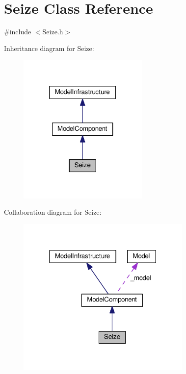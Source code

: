 \hypertarget{class_seize}{}\section{Seize Class Reference}
\label{class_seize}


{\ttfamily \#include $<$Seize.\+h$>$}



Inheritance diagram for Seize\+:
\nopagebreak
\begin{figure}[H]
\begin{center}
\leavevmode
\includegraphics[width=181pt]{class_seize__inherit__graph}
\end{center}
\end{figure}


Collaboration diagram for Seize\+:
\nopagebreak
\begin{figure}[H]
\begin{center}
\leavevmode
\includegraphics[width=242pt]{class_seize__coll__graph}
\end{center}
\end{figure}
